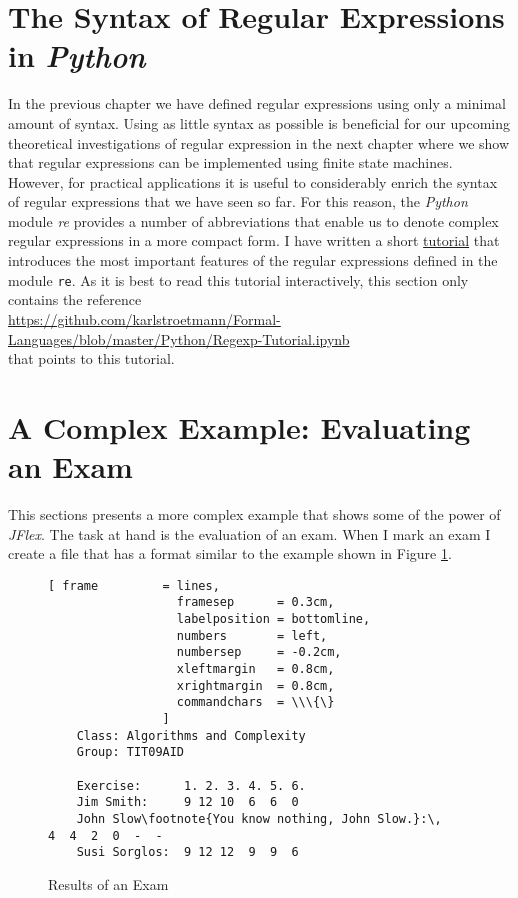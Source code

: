 \section{The Syntax of Regular Expressions in \textsl{Python}}
In the previous chapter we have defined regular expressions using only a minimal amount of syntax. 
Using as little syntax as possible is beneficial for our upcoming theoretical investigations of
regular expression in the next chapter where we show that regular expressions can be implemented
using finite state machines.  However, for practical applications it is useful to considerably
enrich the syntax of regular expressions that we have seen so far.
For this reason, the \textsl{Python} module \textsl{re} provides a number of abbreviations that enable us to denote
complex regular expressions in a more compact form.  I have written a short 
\href{https://github.com/karlstroetmann/Formal-Languages/blob/master/Python/Regexp-Tutorial.ipynb}{tutorial}
that introduces the most important features of the regular expressions defined in the module \texttt{re}.
As it is best to read this tutorial interactively, this section only contains the reference
\\[0.2cm]
\hspace*{1.3cm}
\href{https://github.com/karlstroetmann/Formal-Languages/blob/master/Python/Regexp-Tutorial.ipynb}{https://github.com/karlstroetmann/Formal-Languages/blob/master/Python/Regexp-Tutorial.ipynb}
\\[0.2cm]
that points to this tutorial.

\section{A Complex Example: Evaluating an Exam}
This sections presents a more complex example that shows some of the power of \textsl{JFlex}.  The
task at hand is the evaluation of an exam.  When I mark an exam I create a file that has a format
similar to the example shown in Figure \ref{fig:result.txt}. 

\begin{figure}[!h]
\centering
\begin{Verbatim}[ frame         = lines, 
                  framesep      = 0.3cm, 
                  labelposition = bottomline,
                  numbers       = left,
                  numbersep     = -0.2cm,
                  xleftmargin   = 0.8cm,
                  xrightmargin  = 0.8cm,
                  commandchars  = \\\{\}
                ]
    Class: Algorithms and Complexity
    Group: TIT09AID
    
    Exercise:      1. 2. 3. 4. 5. 6.
    Jim Smith:     9 12 10  6  6  0
    John Slow\footnote{You know nothing, John Slow.}:\,    4  4  2  0  -  -
    Susi Sorglos:  9 12 12  9  9  6
\end{Verbatim}
\vspace*{-0.3cm}
\caption{Results of an Exam}
\label{fig:result.txt}
\end{figure}

